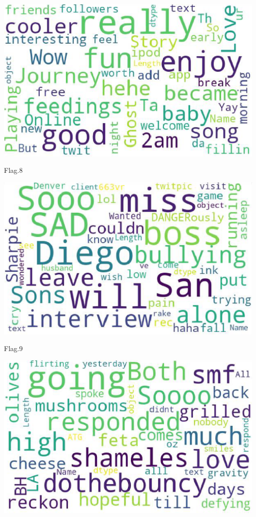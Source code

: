 \begin{center}
  \begin{minipage}{0.5\linewidth}
  \centering

  \includegraphics[width=1\textwidth]{kaggle/1.4.eps}
 
  {\small{Flag.8}}

  \end{minipage}
  \begin{minipage}{0.5\linewidth}
    \centering
  
    \includegraphics[width=1\textwidth]{kaggle/1.5.eps}
   
    {\small{Flag.9}}
  
    \end{minipage}
    \begin{minipage}{0.5\linewidth}
      \centering
      \includegraphics[width=1\textwidth]{kaggle/1.6.eps}
     

\end{minipage}
\end{center}
